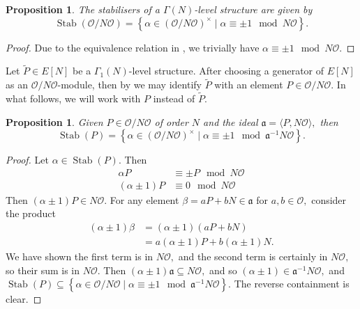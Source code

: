 \documentclass[11pt,a4paper]{amsart}
\theoremstyle{plain}
\newtheorem{prop}[thm]{Proposition}
\theoremstyle{definition}
\theoremstyle{remark}
\DeclareMathOperator{\Stab}{Stab}
\begin{document}
\begin{prop}\label{prop:stab-full-level}
  The stabilisers of a $\Gamma(N)$-level structure are given by
  \[
    \Stab(\mathcal{O}/N\mathcal{O}) = \left\{ \alpha \in (\mathcal{O}/N \mathcal{O})^{\times} \mid \alpha \equiv \pm 1 \mod N\mathcal{O} \right\}.
  \]
\end{prop}
\begin{proof}
  Due to the equivalence relation in , we trivially have $\alpha \equiv \pm1 \mod N\mathcal{O}.$
\end{proof}
Let $\tilde{P} \in E[N]$ be a $\Gamma_1(N)$-level structure. After choosing a generator of $E[N]$ as an $\mathcal{O}/N \mathcal{O}$-module, then by  we may identify $\tilde{P}$ with an element $P \in \mathcal{O}/N\mathcal{O}.$ In what follows, we will work with $P$ instead of $\tilde{P}.$
\begin{prop}\label{prop:stab-gamma-1}
  Given $P \in \mathcal{O}/N\mathcal{O}$ of order $N$ and the ideal $\mathfrak{a} = \langle P, N\mathcal{O} \rangle,$ then
    \[
      \Stab(P) = \left\{ \alpha \in (\mathcal{O}/N \mathcal{O})^{\times} \mid \alpha \equiv \pm 1 \mod \mathfrak{a}^{-1}N\mathcal{O} \right\}.
    \]
\end{prop}
\begin{proof}
  Let $\alpha \in \Stab(P).$ Then
  \begin{align*}
    \alpha P &\equiv \pm P \mod N\mathcal{O} \\
    (\alpha \pm 1)P &\equiv 0 \mod N\mathcal{O}
  \end{align*}
  Then $(\alpha \pm 1)P \in N \mathcal{O}.$ For any element $\beta = aP + bN \in \mathfrak{a}$ for $a,b \in \mathcal{O},$ consider the product
  \begin{align*}
    (\alpha \pm 1)\beta &= (\alpha \pm 1)(aP + bN) \\
                        &= a(\alpha \pm 1)P + b(\alpha \pm 1)N.
  \end{align*}
  We have shown the first term is in $N \mathcal{O},$ and the second term is certainly in $N \mathcal{O},$ so their sum is in $N \mathcal{O}.$ Then $(\alpha \pm 1)\mathfrak{a} \subseteq N \mathcal{O},$ and so $(\alpha \pm 1) \in \mathfrak{a}^{-1}N \mathcal{O},$ and $\Stab(P) \subseteq \left\{ \alpha \in \mathcal{O}/N \mathcal{O} \mid \alpha \equiv \pm 1 \mod \mathfrak{a}^{-1}N \mathcal{O} \right\}.$ The reverse containment is clear.
  \end{proof}
\end{document}
